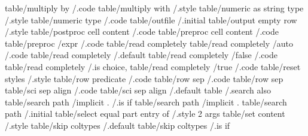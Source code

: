 table/multiply by                                                               /.code        
table/multiply with                                                             /.style       
table/numeric as string type                                                    /.style       
table/numeric type                                                              /.code        
table/outfile                                                                   /.initial     
table/output empty row                                                          /.style       
table/postproc cell content                                                     /.code        
table/preproc cell content                                                      /.code        
table/preproc                      /expr                                        /.code        
table/read completely              
table/read completely              /auto                                        /.code        
table/read completely                                                           /.default     
table/read completely              /false                                       /.code        
table/read completely                                                           /.is choice,  
table/read completely              /true                                        /.code        
table/reset styles                                                              /.style       
table/row predicate                                                             /.code        
table/row sep                                                                   /.code        
table/row sep                      
table/sci sep align                                                             /.code        
table/sci sep align                                                             /.default     
table                                                                           /.search also 
table/search path                  /implicit .                                  /.is if       
table/search path                  /implicit .             
table/search path                                                               /.initial     
table/select equal part entry of                                                /.style 2 args
table/set content                                                               /.style       
table/skip coltypes                                                             /.default     
table/skip coltypes                                                             /.is if       

